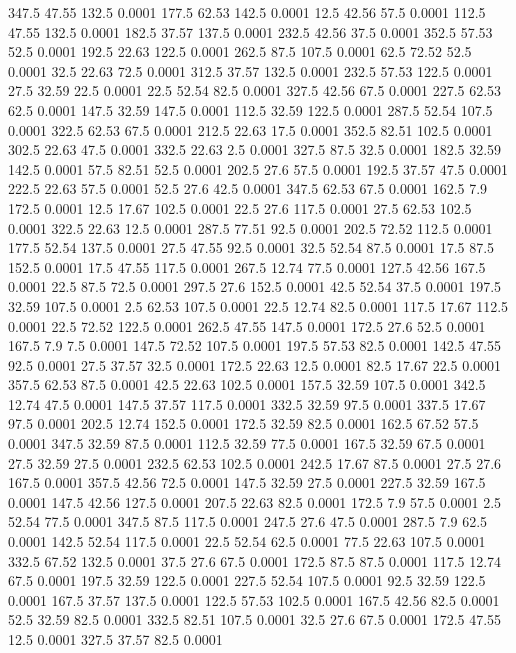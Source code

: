 347.5	47.55	132.5	0.0001
177.5	62.53	142.5	0.0001
12.5	42.56	57.5	0.0001
112.5	47.55	132.5	0.0001
182.5	37.57	137.5	0.0001
232.5	42.56	37.5	0.0001
352.5	57.53	52.5	0.0001
192.5	22.63	122.5	0.0001
262.5	87.5	107.5	0.0001
62.5	72.52	52.5	0.0001
32.5	22.63	72.5	0.0001
312.5	37.57	132.5	0.0001
232.5	57.53	122.5	0.0001
27.5	32.59	22.5	0.0001
22.5	52.54	82.5	0.0001
327.5	42.56	67.5	0.0001
227.5	62.53	62.5	0.0001
147.5	32.59	147.5	0.0001
112.5	32.59	122.5	0.0001
287.5	52.54	107.5	0.0001
322.5	62.53	67.5	0.0001
212.5	22.63	17.5	0.0001
352.5	82.51	102.5	0.0001
302.5	22.63	47.5	0.0001
332.5	22.63	2.5	0.0001
327.5	87.5	32.5	0.0001
182.5	32.59	142.5	0.0001
57.5	82.51	52.5	0.0001
202.5	27.6	57.5	0.0001
192.5	37.57	47.5	0.0001
222.5	22.63	57.5	0.0001
52.5	27.6	42.5	0.0001
347.5	62.53	67.5	0.0001
162.5	7.9	172.5	0.0001
12.5	17.67	102.5	0.0001
22.5	27.6	117.5	0.0001
27.5	62.53	102.5	0.0001
322.5	22.63	12.5	0.0001
287.5	77.51	92.5	0.0001
202.5	72.52	112.5	0.0001
177.5	52.54	137.5	0.0001
27.5	47.55	92.5	0.0001
32.5	52.54	87.5	0.0001
17.5	87.5	152.5	0.0001
17.5	47.55	117.5	0.0001
267.5	12.74	77.5	0.0001
127.5	42.56	167.5	0.0001
22.5	87.5	72.5	0.0001
297.5	27.6	152.5	0.0001
42.5	52.54	37.5	0.0001
197.5	32.59	107.5	0.0001
2.5	62.53	107.5	0.0001
22.5	12.74	82.5	0.0001
117.5	17.67	112.5	0.0001
22.5	72.52	122.5	0.0001
262.5	47.55	147.5	0.0001
172.5	27.6	52.5	0.0001
167.5	7.9	7.5	0.0001
147.5	72.52	107.5	0.0001
197.5	57.53	82.5	0.0001
142.5	47.55	92.5	0.0001
27.5	37.57	32.5	0.0001
172.5	22.63	12.5	0.0001
82.5	17.67	22.5	0.0001
357.5	62.53	87.5	0.0001
42.5	22.63	102.5	0.0001
157.5	32.59	107.5	0.0001
342.5	12.74	47.5	0.0001
147.5	37.57	117.5	0.0001
332.5	32.59	97.5	0.0001
337.5	17.67	97.5	0.0001
202.5	12.74	152.5	0.0001
172.5	32.59	82.5	0.0001
162.5	67.52	57.5	0.0001
347.5	32.59	87.5	0.0001
112.5	32.59	77.5	0.0001
167.5	32.59	67.5	0.0001
27.5	32.59	27.5	0.0001
232.5	62.53	102.5	0.0001
242.5	17.67	87.5	0.0001
27.5	27.6	167.5	0.0001
357.5	42.56	72.5	0.0001
147.5	32.59	27.5	0.0001
227.5	32.59	167.5	0.0001
147.5	42.56	127.5	0.0001
207.5	22.63	82.5	0.0001
172.5	7.9	57.5	0.0001
2.5	52.54	77.5	0.0001
347.5	87.5	117.5	0.0001
247.5	27.6	47.5	0.0001
287.5	7.9	62.5	0.0001
142.5	52.54	117.5	0.0001
22.5	52.54	62.5	0.0001
77.5	22.63	107.5	0.0001
332.5	67.52	132.5	0.0001
37.5	27.6	67.5	0.0001
172.5	87.5	87.5	0.0001
117.5	12.74	67.5	0.0001
197.5	32.59	122.5	0.0001
227.5	52.54	107.5	0.0001
92.5	32.59	122.5	0.0001
167.5	37.57	137.5	0.0001
122.5	57.53	102.5	0.0001
167.5	42.56	82.5	0.0001
52.5	32.59	82.5	0.0001
332.5	82.51	107.5	0.0001
32.5	27.6	67.5	0.0001
172.5	47.55	12.5	0.0001
327.5	37.57	82.5	0.0001
